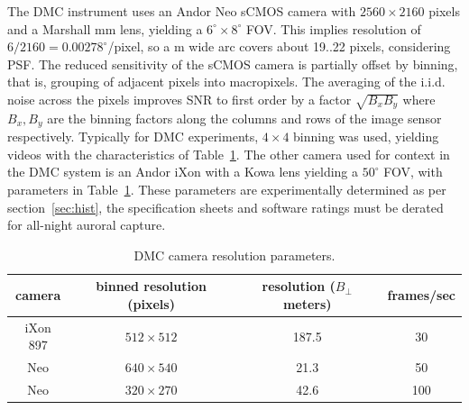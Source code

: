 The DMC instrument uses an Andor Neo sCMOS camera with $2560 \times 2160$ pixels and a Marshall \unit[140]{mm} lens, yielding a $6^\circ \times 8^\circ$ FOV.
This implies resolution of $6/2160 = 0.00278^\circ$/pixel, so a \unit[100]{m} wide arc covers about 19..22 pixels, considering PSF.
The reduced sensitivity of the sCMOS camera is partially offset by binning, that is, grouping of adjacent pixels into macropixels.
The averaging of the i.i.d. noise across the pixels improves SNR to first order by a factor $\sqrt{B_xB_y}$ where $B_x, B_y$ are the binning factors along the columns and rows of the image sensor respectively.
Typically for DMC experiments, $4 \times 4$ binning was used, yielding videos with the characteristics of Table~\ref{tab:cameraresdmc}.
The other camera used for context in the DMC system is an Andor iXon with a Kowa lens yielding a $50^\circ$ FOV, with parameters in Table~\ref{tab:cameraresdmc}.
These parameters are experimentally determined as per section~\ref{sec:hist}, the specification sheets and software ratings must be derated for all-night auroral capture.
\begin{table}\centering
    \caption{DMC camera resolution parameters.}\label{tab:cameraresdmc}
    \begin{tabular}{cccc}
        \toprule
        camera & binned resolution (pixels) & resolution ($B_\perp$ meters) & frames/sec\\
        \midrule
        iXon 897 & $512 \times 512$ & 187.5 & 30  \\
        Neo & $640 \times 540$ & 21.3 & 50 \\
        Neo & $320 \times 270$ & 42.6 & 100 \\
        \bottomrule
    \end{tabular}
\end{table}

